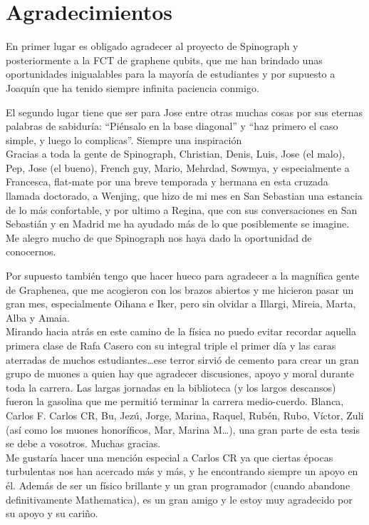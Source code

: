 \chapter*{Agradecimientos}
En primer lugar es obligado agradecer al proyecto de Spinograph y posteriormente a la FCT de graphene qubits, que me han brindado unas oportunidades inigualables para la mayoría de estudiantes y por supuesto a Joaquín que ha tenido siempre infinita paciencia conmigo.


El segundo lugar tiene que ser para Jose entre otras muchas cosas por sus eternas palabras de sabiduría: ``Piénsalo en la base diagonal'' y ``haz primero el caso simple, y luego lo complicas''. Siempre una inspiración\\

Gracias a toda la gente de Spinograph, Christian, Denis, Luis, Jose (el malo), Pep, Jose (el bueno), French guy, Mario, Mehrdad, Sowmya, y especialmente a Francesca, flat-mate por una breve temporada y hermana en esta cruzada llamada doctorado, a Wenjing, que hizo de mi mes en San Sebastian una estancia de lo más confortable, y por ultimo a Regina, que con sus conversaciones en San Sebastián y en Madrid me ha ayudado más de lo que posiblemente se imagine. Me alegro mucho de que Spinograph nos haya dado la oportunidad de conocernos.

Por supuesto también tengo que hacer hueco para agradecer a la magnífica gente de Graphenea, que me acogieron con los brazos abiertos y me hicieron pasar un gran mes, especialmente Oihana e Iker, pero sin olvidar a Illargi, Mireia, Marta, Alba y Amaia.\\


Mirando hacia atrás en este camino de la física no puedo evitar recordar aquella primera clase de Rafa Casero con su integral triple el primer día y las caras aterradas de muchos estudiantes\dots ese terror sirvió de cemento para crear un gran grupo de muones a quien hay que agradecer discusiones, apoyo y moral durante toda la carrera.
Las largas jornadas en la biblioteca (y los largos descansos) fueron la gasolina que me permitió terminar la carrera medio-cuerdo. Blanca, Carlos F. Carlos CR, Bu, Jezú, Jorge, Marina, Raquel, Rubén, Rubo, Víctor, Zuli (así como los muones honoríficos, Mar, Marina M\dots), una gran parte de esta tesis se debe a vosotros. Muchas gracias.\\

Me gustaría hacer una mención especial a Carlos CR ya que ciertas épocas turbulentas nos han acercado más y más, y he encontrando siempre un apoyo en él. Además de ser un físico brillante y un gran programador (cuando abandone definitivamente Mathematica), es un gran amigo y le estoy muy agradecido por su apoyo y su cariño.\\

